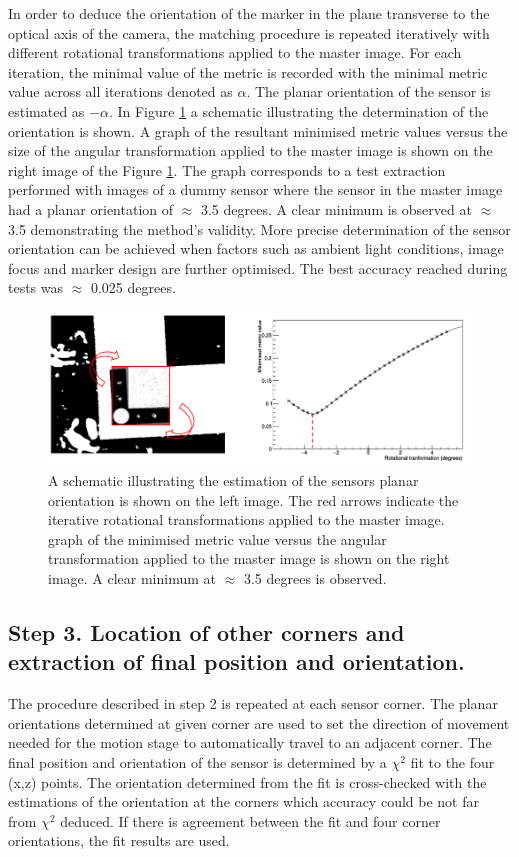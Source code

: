In order to deduce the orientation of the marker in the plane transverse to the optical axis of the camera, the matching procedure is repeated iteratively with different rotational transformations applied to the master image. For each iteration, the minimal value of the metric is recorded with the minimal metric value across all iterations denoted as $\alpha$. The planar orientation of the sensor is estimated as $-\alpha$. In Figure \ref{fig:template_rotation} a schematic illustrating the determination of the orientation is shown. A graph of the resultant minimised metric values versus the size of the angular transformation applied to the master image is shown on the right image of the Figure \ref{fig:template_rotation}. The graph corresponds to a test extraction performed with images of a dummy sensor where the sensor in the master image had a planar orientation of $\approx$ 3.5 degrees. A clear minimum is observed at $\approx$ 3.5 demonstrating the method's validity. More precise determination of the sensor orientation can be achieved when factors such as ambient light conditions, image focus and marker design are further optimised. The best accuracy reached during tests was $\approx$ 0.025 degrees.

\begin{figure}[ht]\centering
\includegraphics[width=0.9\linewidth]{Data/Control_Software/Template_rotation.png}
\caption{A schematic illustrating the estimation of the sensors planar orientation is shown on the left image. The red arrows indicate the iterative rotational transformations applied to the master image. graph of the minimised metric value versus the angular transformation applied to the master image is shown on the right image. A clear minimum at $\approx$ 3.5 degrees is observed.}
\label{fig:template_rotation}
\end{figure}

\subsection{Step 3. Location of other corners and extraction of final position and orientation.}
The procedure described in step 2 is repeated at each sensor corner. The planar orientations determined at given corner are used to set the direction of movement needed for the motion stage to automatically travel to an adjacent corner. The final position and orientation of the sensor is determined by a $\chi^{2}$ fit to the four (x,z) points. The orientation determined from the fit is cross-checked with the estimations of the orientation at the corners which accuracy could be not far from $\chi^{2}$ deduced. If there is agreement between the fit and four corner orientations, the fit results are used.

